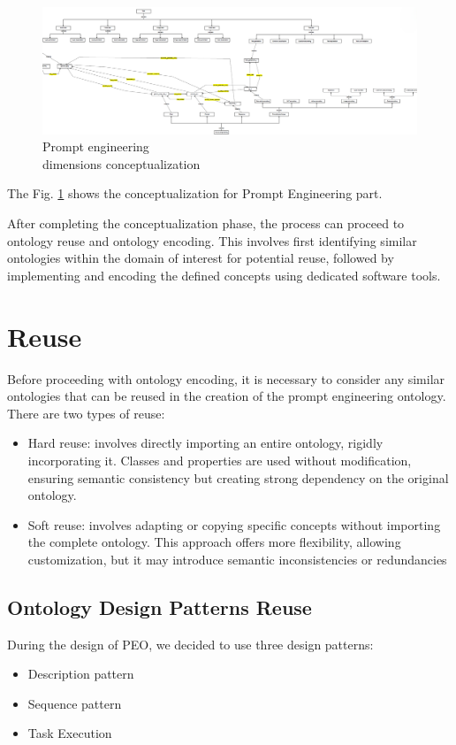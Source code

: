 \begin{figure}[H]
    \centering
    \includegraphics[width=0.9\linewidth]{Figures/fig_27.png}
    \caption{Prompt engineering\\ dimensions conceptualization}
    \label{fig:27}
\end{figure}
The Fig. \ref{fig:27} shows the conceptualization for Prompt Engineering part.

After completing the conceptualization phase, the process can proceed to ontology reuse and ontology encoding.
This involves first identifying similar ontologies within the domain of interest for potential reuse, followed by implementing and encoding the defined concepts using dedicated software tools.

\section{Reuse}
\label{section:4_2_reuse}
Before proceeding with ontology encoding, it is necessary to consider any similar ontologies that can be reused in the creation of the prompt engineering ontology. There are two types of reuse:
\begin{itemize}
    \item Hard reuse: involves directly importing an entire ontology, rigidly incorporating it. Classes and properties are used without modification, ensuring semantic consistency but creating strong dependency on the original ontology.

    \item Soft reuse: involves adapting or copying specific concepts without importing the complete ontology. This approach offers more flexibility, allowing customization, but it may introduce semantic inconsistencies or redundancies 
\end{itemize}

\subsection{Ontology Design Patterns Reuse}
\label{subsection:4_2_1_design_patterns}
During the design of PEO, we decided to use three design patterns:
\begin{itemize}
    \item Description pattern
    \item Sequence pattern
    \item Task Execution
\end{itemize}

